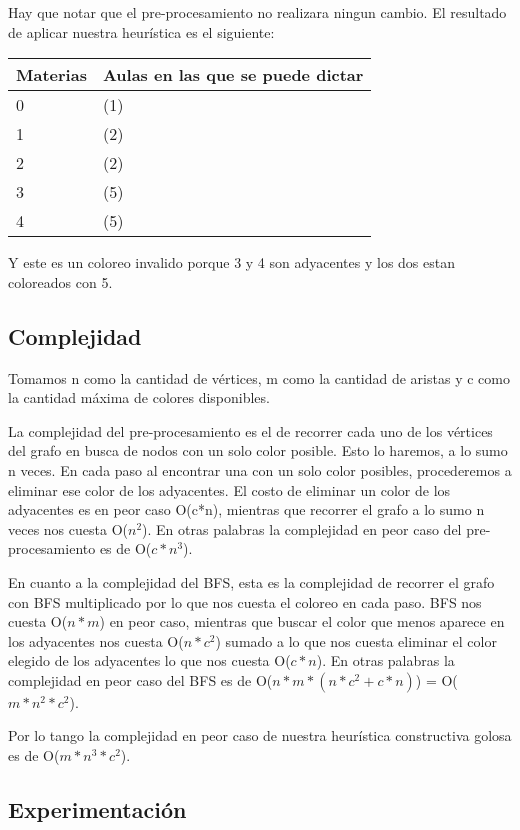 Hay que notar que el pre-procesamiento no realizara ningun cambio. El resultado de aplicar nuestra heurística es el siguiente:

\begin{table}[H]
\begin{center}
\begin{tabular}{|l|l|}
\hline
Materias & Aulas en las que se puede dictar \\
\hline \hline
0 & (1) \\ \hline
1 & (2) \\ \hline
2 & (2) \\ \hline
3 & (5) \\ \hline
4 & (5) \\ \hline
\end{tabular}
\end{center}
\end{table}

Y este es un coloreo invalido porque 3 y 4 son adyacentes y los dos estan coloreados con 5.

\subsection{Complejidad}

Tomamos n como la cantidad de vértices, m como la cantidad de aristas y c como la cantidad máxima de colores disponibles.

La complejidad del pre-procesamiento es el de recorrer cada uno de los vértices del grafo en busca de nodos con un solo color posible. Esto lo haremos, a lo sumo n veces.
En cada paso al encontrar una con un solo color posibles, procederemos a eliminar ese color de los adyacentes. El costo de eliminar un color de los adyacentes es en peor caso
O(c*n), mientras que recorrer el grafo a lo sumo n veces nos cuesta O($n^2$). En otras palabras la complejidad en peor caso del pre-procesamiento es de O($c*n^3$).

En cuanto a la complejidad del BFS, esta es la complejidad de recorrer el grafo con BFS multiplicado por lo que nos cuesta el coloreo en cada paso. BFS nos cuesta O($n*m$) en 
peor caso, mientras que buscar el color que menos aparece en los adyacentes nos cuesta O($n*c^2$) sumado a lo que nos cuesta eliminar el color elegido de los adyacentes lo que 
nos cuesta O($c*n$). En otras palabras la complejidad en peor caso del BFS es de O($n*m*(n*c^2 + c*n)$) = O($m*n^2*c^2$).

Por lo tango la complejidad en peor caso de nuestra heurística constructiva golosa es de O($m*n^3*c^2$).







\subsection{Experimentación}
